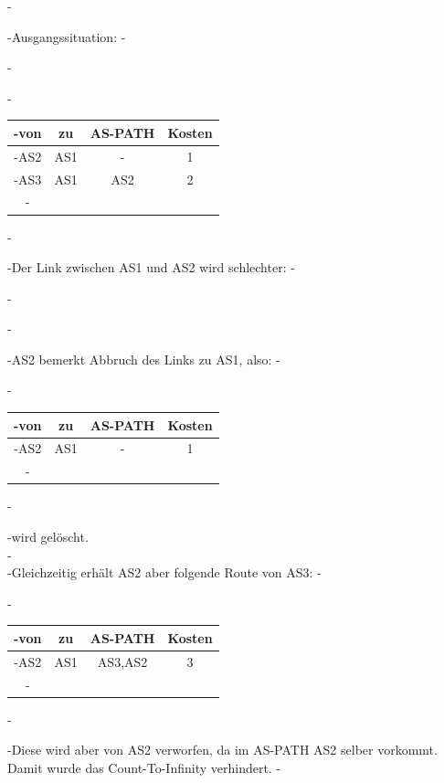 \documentclass[a4paper,
			llpt,
			solution,
			accentcolor=tud2d,
			colorbacktitle
			]
			{tudexercise}
\newcommand{\8}{$\infty$}
\begin{document}
-\begin{multicols}{2}
-Ausgangssituation:
-\begin{center}
-
-\begin{tabular}{c|c|c|c}
-von &  zu  &  AS-PATH &  Kosten \\ \hline
-AS2 &  AS1 &   -      &   1 \\
-AS3 &  AS1 &   AS2    &   2 \\
-\end{tabular}
-\end{center}
-Der Link zwischen AS1 und AS2 wird schlechter:
-\begin{center}
-
-\end{center}
-AS2 bemerkt Abbruch des Links zu AS1, also:
-\begin{center}
-\begin{tabular}{c|c|c|c}
-von &  zu &   AS-PATH &  Kosten \\ \hline
-AS2 &  AS1 &   -    &    1 \\
-\end{tabular}
-\end{center}
-wird gelöscht.\\
-~\\
-Gleichzeitig erhält AS2 aber folgende Route von AS3:
-\begin{center}
-\begin{tabular}{c|c|c|c}
-von &  zu  &  AS-PATH &  Kosten \\ \hline
-AS2 &  AS1 &  AS3,AS2  &  3 \\
-\end{tabular}
-\end{center}
-Diese wird aber von AS2 verworfen, da im AS-PATH AS2 selber vorkommt. Damit wurde das Count-To-Infinity verhindert.
-\end{multicols}
\end{document}
